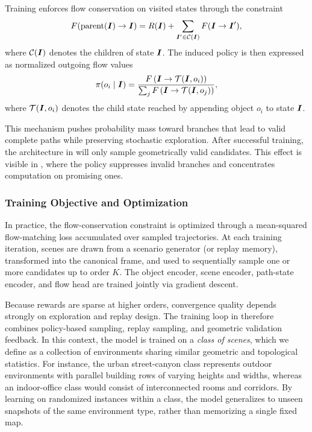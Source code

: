 Training enforces flow conservation on visited states through the constraint
\begin{equation}
  F(\mathrm{parent}(\boldsymbol{I})\rightarrow\boldsymbol{I}) = R(\boldsymbol{I}) + \sum_{\boldsymbol{I}'\in\mathcal{C}(\boldsymbol{I})}F(\boldsymbol{I}\rightarrow\boldsymbol{I}'),
\end{equation}
where $\mathcal{C}(\boldsymbol{I})$ denotes the children of state $\boldsymbol{I}$. The induced policy is then expressed as normalized outgoing flow values
\begin{equation}
  \pi(o_i\mid\boldsymbol{I}) = \frac{F\left(\boldsymbol{I}\rightarrow\mathcal{T}(\boldsymbol{I},o_i)\right)}{\sum_j F\left(\boldsymbol{I}\rightarrow\mathcal{T}(\boldsymbol{I},o_j)\right)},
\end{equation}
where $\mathcal{T}(\boldsymbol{I},o_i)$ denotes the child state reached by appending object $o_i$ to state $\boldsymbol{I}$.

This mechanism pushes probability mass toward branches that lead to valid complete paths while preserving stochastic exploration. After successful training, the architecture in  will only sample geometrically valid candidates. This effect is visible in , where the policy suppresses invalid branches and concentrates computation on promising ones.

\subsubsection{Training Objective and Optimization}

In practice, the flow-conservation constraint is optimized through a mean-squared flow-matching loss accumulated over sampled trajectories. At each training iteration, scenes are drawn from a scenario generator (or replay memory), transformed into the canonical frame, and used to sequentially sample one or more candidates up to order $K$. The object encoder, scene encoder, path-state encoder, and flow head are trained jointly via gradient descent.

Because rewards are sparse at higher orders, convergence quality depends strongly on exploration and replay design. The training loop in  therefore combines policy-based sampling, replay sampling, and geometric validation feedback. In this context, the model is trained on a \emph{class of scenes}, which we define as a collection of environments sharing similar geometric and topological statistics. For instance, the urban street-canyon class represents outdoor environments with parallel building rows of varying heights and widths, whereas an indoor-office class would consist of interconnected rooms and corridors. By learning on randomized instances within a class, the model generalizes to unseen snapshots of the same environment type, rather than memorizing a single fixed map.

